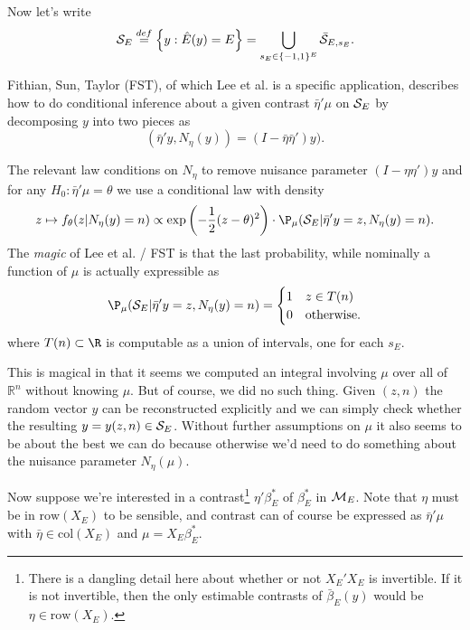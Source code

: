 \documentclass{article}
\newcommand{\OLS}{\bar{\beta}}
\begin{document}
        Now let's write
        $$ {\cal S}_E \overset{def}{=} \left\{y: \hat{E}(y)=E\right\}
        = \bigcup_{s_E \in \{-1,1\}^E} \bar{\cal S}_{E,s_E}.
        $$

        Fithian, Sun, Taylor (FST), of which Lee et al. is a specific
        application, describes how to do conditional inference about a
        given contrast $\bar{\eta}'\mu$ on ${\cal S}_E$ by decomposing
        $y$ into two pieces as
        $$ (\bar{\eta}'y, N_{\eta}(y))=(I - \bar{\eta}\bar{\eta}')y).
        $$

        The relevant law conditions on $N_{\eta}$ to remove nuisance
        parameter $(I-\eta\eta')y$ and for any
        $H_0:\bar{\eta}'\mu=\theta$ we use a conditional law with
        density
        \begin{equation}
          \label{eq:selective:density}
        z \mapsto f_{\theta}(z | N_{\eta}(y)=n) \propto \exp
        \left(-\frac{1}{2}(z-\theta)^2 \right) \cdot \P_{\mu}({\cal
          S}_E | \bar{\eta}'y=z, N_{\eta}(y)=n).
        \end{equation}
        The {\em magic} of Lee et al. / FST is that the last
        probability, while nominally a function of $\mu$ is actually
        expressible as
        \begin{equation}
          \label{eq:prob:selection}
        \P_{\mu}({\cal S}_E | \bar{\eta}'y=z, N_{\eta}(y)=n) =
        \begin{cases}
          1 & z \in T(n) \\ 0 & \text{otherwise.}
          \end{cases}
        \end{equation}
        where $T(n) \subset \R$ is computable as a union of intervals,
        one for each $s_E$.

        This is magical in that it seems we computed an integral
        involving $\mu$ over all of $\mathbb{R}^n$ without knowing
        $\mu$. But of course, we did no such thing.  Given $(z,n)$ the
        random vector $y$ can be reconstructed explicitly and we can
        simply check whether the resulting $y=y(z,n) \in {\cal S}_E$.
        Without further assumptions on $\mu$ it also seems to be about
        the best we can do because otherwise we'd need to do something
        about the nuisance parameter $N_{\eta}(\mu)$.

        Now suppose we're interested in a contrast\footnote{There is a dangling
        detail here about whether or not $X_E'X_E$ is invertible. If it is not invertible,
        then the only estimable contrasts of $\OLS_E(y)$ would be $\eta \in \text{row}(X_E)$.} $\eta'\beta_E^*$
        of
        $\beta_E^*$ in ${\cal M}_E$. Note that $\eta$ must be in
        $\text{row}(X_E)$ to be sensible, and contrast can of course
        be expressed as $\bar{\eta}'\mu$ with $\bar{\eta} \in \text{col}(X_E)$ and
        $\mu=X_E\beta_E^*$.
        
\end{document}
